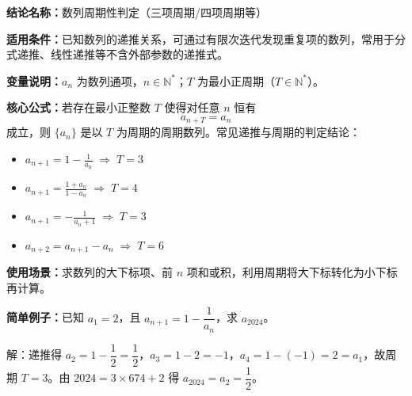 \textbf{结论名称：}数列周期性判定（三项周期/四项周期等）

\textbf{适用条件：}已知数列的递推关系，可通过有限次迭代发现重复项的数列，常用于分式递推、线性递推等不含外部参数的递推式。

\textbf{变量说明：}$a_n$ 为数列通项，$n\in\mathbb{N}^*$；$T$ 为最小正周期（$T\in\mathbb{N}^*$）。

\textbf{核心公式：}若存在最小正整数 $T$ 使得对任意 $n$ 恒有
\[
\boxed{a_{n+T}=a_n}
\]
成立，则 $\{a_n\}$ 是以 $T$ 为周期的周期数列。常见递推与周期的判定结论：
\begin{itemize}
\item $\displaystyle a_{n+1}=1-\frac{1}{a_n}\;\Longrightarrow\; T=3$
\item $\displaystyle a_{n+1}=\frac{1+a_n}{1-a_n}\;\Longrightarrow\; T=4$
\item $\displaystyle a_{n+1}=-\frac{1}{a_n+1}\;\Longrightarrow\; T=3$
\item $\displaystyle a_{n+2}=a_{n+1}-a_n\;\Longrightarrow\; T=6$
\end{itemize}

\textbf{使用场景：}求数列的大下标项、前 $n$ 项和或积，利用周期将大下标转化为小下标再计算。

\textbf{简单例子：}已知 $a_1=2$，且 $a_{n+1}=1-\dfrac{1}{a_n}$，求 $a_{2024}$。

解：递推得 $a_2=1-\dfrac{1}{2}=\dfrac{1}{2}$，$a_3=1-2=-1$，$a_4=1-(-1)=2=a_1$，故周期 $T=3$。由 $2024=3\times 674+2$ 得 $a_{2024}=a_2=\dfrac{1}{2}$。